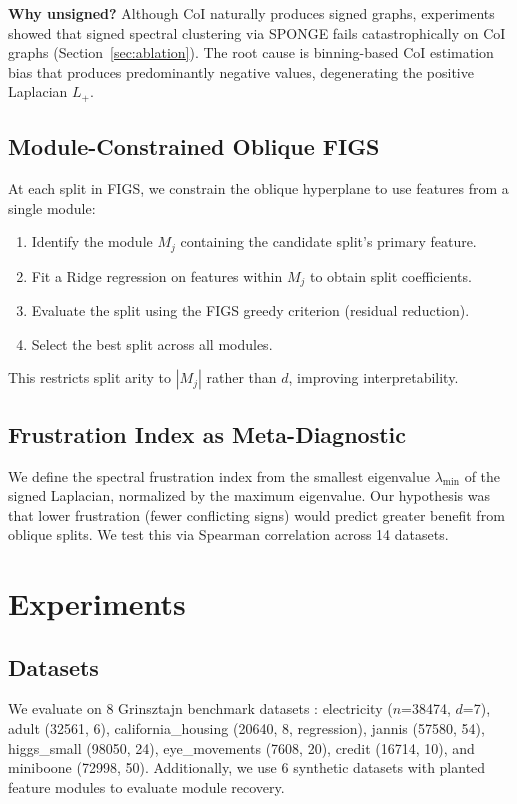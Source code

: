 \documentclass[11pt,letterpaper]{article}
\begin{document}
\textbf{Why unsigned?}
Although CoI naturally produces signed graphs, experiments showed that signed spectral clustering via SPONGE \citep{Cucuringu2020} fails catastrophically on CoI graphs (Section~\ref{sec:ablation}).
The root cause is binning-based CoI estimation bias that produces predominantly negative values, degenerating the positive Laplacian $L_+$.

\subsection{Module-Constrained Oblique FIGS}

At each split in FIGS, we constrain the oblique hyperplane to use features from a single module:
\begin{enumerate}
    \item Identify the module $M_j$ containing the candidate split's primary feature.
    \item Fit a Ridge regression on features within $M_j$ to obtain split coefficients.
    \item Evaluate the split using the FIGS greedy criterion (residual reduction).
    \item Select the best split across all modules.
\end{enumerate}
This restricts split arity to $|M_j|$ rather than $d$, improving interpretability.

\subsection{Frustration Index as Meta-Diagnostic}

We define the spectral frustration index from the smallest eigenvalue $\lambda_{\min}$ of the signed Laplacian, normalized by the maximum eigenvalue.
Our hypothesis was that lower frustration (fewer conflicting signs) would predict greater benefit from oblique splits.
We test this via Spearman correlation across 14 datasets.

\section{Experiments}

\subsection{Datasets}

We evaluate on 8 Grinsztajn benchmark datasets \citep{Grinsztajn2022}: electricity ($n$=38474, $d$=7), adult (32561, 6), california\_housing (20640, 8, regression), jannis (57580, 54), higgs\_small (98050, 24), eye\_movements (7608, 20), credit (16714, 10), and miniboone (72998, 50).
Additionally, we use 6 synthetic datasets with planted feature modules to evaluate module recovery.
\end{document}
